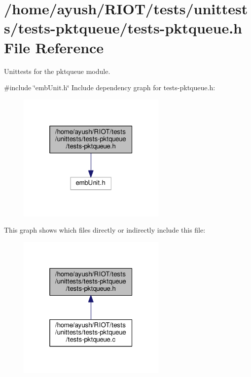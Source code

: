 \hypertarget{tests-pktqueue_8h}{}\section{/home/ayush/\+R\+I\+O\+T/tests/unittests/tests-\/pktqueue/tests-\/pktqueue.h File Reference}
\label{tests-pktqueue_8h}


Unittests for the {\ttfamily pktqueue} module.  


{\ttfamily \#include \char`\"{}emb\+Unit.\+h\char`\"{}}\newline
Include dependency graph for tests-\/pktqueue.h\+:
\nopagebreak
\begin{figure}[H]
\begin{center}
\leavevmode
\includegraphics[width=205pt]{tests-pktqueue_8h__incl}
\end{center}
\end{figure}
This graph shows which files directly or indirectly include this file\+:
\nopagebreak
\begin{figure}[H]
\begin{center}
\leavevmode
\includegraphics[width=205pt]{tests-pktqueue_8h__dep__incl}
\end{center}
\end{figure}
